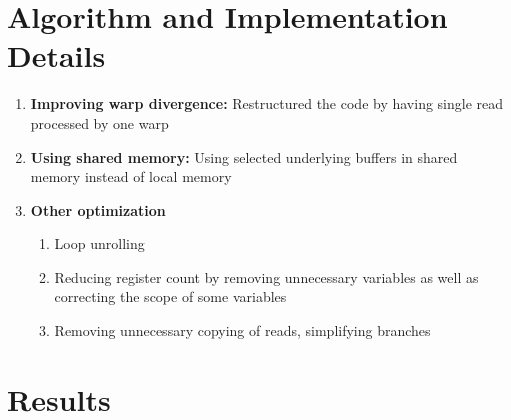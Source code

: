 \documentclass[a0,portrait]{a0poster}
\begin{document}
\begin{multicols}{2}

\color{DarkRed} 
\section*{Algorithm and Implementation Details}
\color{Black} 

\begin{enumerate}
\item \textbf{Improving warp divergence:} Restructured the code by having single read processed by one warp
\item \textbf{Using shared memory:} Using selected underlying buffers in shared memory instead of local memory
\item \textbf{Other optimization} 
	\begin{enumerate}
    	\item Loop unrolling
        \item Reducing register count by removing unnecessary variables as well as correcting the scope of some variables
        \item Removing unnecessary copying of reads, simplifying branches
    \end{enumerate}
\end{enumerate}


\begin{minipage}{.235\textwidth}
\small

\end{minipage}
\begin{minipage}{0.235\textwidth}
\small

\end{minipage}
\vspace{1cm}

\color{DarkRed} 
\section*{Results}
\color{Black} 

\vspace*{-2cm}



\end{multicols}
\end{document}
